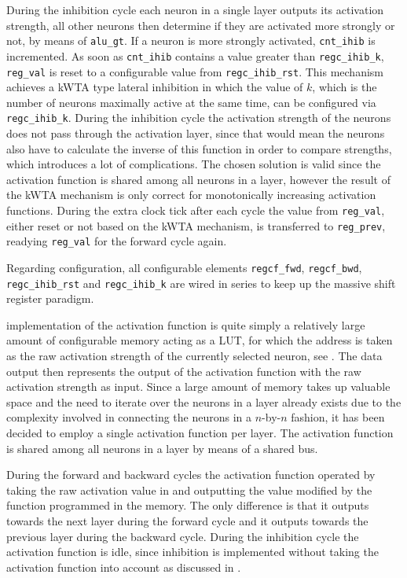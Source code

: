During the inhibition cycle each neuron in a single layer outputs its activation strength, all other neurons then determine if they are activated more strongly or not, by means of \texttt{alu\_gt}. If a neuron is more strongly activated, \texttt{cnt\_ihib} is incremented. As soon as \texttt{cnt\_ihib} contains a value greater than \texttt{regc\_ihib\_k}, \texttt{reg\_val} is reset to a configurable value from \texttt{regc\_ihib\_rst}. This mechanism achieves a \ac{kWTA} type lateral inhibition in which the value of $k$, which is the number of neurons maximally active at the same time, can be configured via \texttt{regc\_ihib\_k}. During the inhibition cycle the activation strength of the neurons does not pass through the activation layer, since that would mean the neurons also have to calculate the inverse of this function in order to compare strengths, which introduces a lot of complications. The chosen solution is valid since the activation function is shared among all neurons in a layer, however the result of the \ac{kWTA} mechanism is only correct for monotonically increasing activation functions. During the extra clock tick after each cycle the value from \texttt{reg\_val}, either reset or not based on the \ac{kWTA} mechanism, is transferred to \texttt{reg\_prev}, readying \texttt{reg\_val} for the forward cycle again.

Regarding configuration, all configurable elements \texttt{regcf\_fwd}, \texttt{regcf\_bwd}, \texttt{regc\_ihib\_rst} and \texttt{regc\_ihib\_k} are wired in series to keep up the massive shift register paradigm.

 implementation of the activation function is quite simply a relatively large amount of configurable memory acting as a \ac{LUT}, for which the address is taken as the raw activation strength of the currently selected neuron, see . The data output then represents the output of the activation function with the raw activation strength as input. Since a large amount of memory takes up valuable space and the need to iterate over the neurons in a layer already exists due to the complexity involved in connecting the neurons in a $n$-by-$n$ fashion, it has been decided to employ a single activation function per layer. The activation function is shared among all neurons in a layer by means of a shared bus.

During the forward and backward cycles the activation function operated by taking the raw activation value in and outputting the value modified by the function programmed in the memory. The only difference is that it outputs towards the next layer during the forward cycle and it outputs towards the previous layer during the backward cycle. During the inhibition cycle the activation function is idle, since inhibition is implemented without taking the activation function into account as discussed in .

